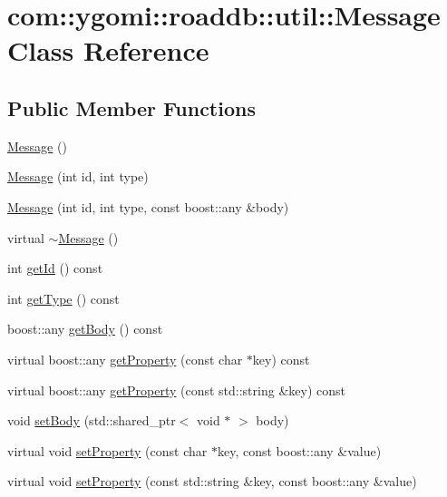 \hypertarget{classcom_1_1ygomi_1_1roaddb_1_1util_1_1Message}{\section{com\-:\-:ygomi\-:\-:roaddb\-:\-:util\-:\-:Message Class Reference}
\label{classcom_1_1ygomi_1_1roaddb_1_1util_1_1Message}
}
\subsection*{Public Member Functions}
\begin{DoxyCompactItemize}
\item 
\hyperlink{classcom_1_1ygomi_1_1roaddb_1_1util_1_1Message_a7013741ef0d9d35dac1c4634272fe690}{Message} ()
\item 
\hyperlink{classcom_1_1ygomi_1_1roaddb_1_1util_1_1Message_aa3a005ef9465847783c122bd13cdb5d2}{Message} (int id, int type)
\item 
\hyperlink{classcom_1_1ygomi_1_1roaddb_1_1util_1_1Message_aa7b887436102ba55630ed94858b7ce5b}{Message} (int id, int type, const boost\-::any \&body)
\item 
virtual \hyperlink{classcom_1_1ygomi_1_1roaddb_1_1util_1_1Message_a348a100b81bd1dfe99669a3d390da0fc}{$\sim$\-Message} ()
\item 
int \hyperlink{classcom_1_1ygomi_1_1roaddb_1_1util_1_1Message_aee9d535ec201f6c3ef78cbdc819d1ba4}{get\-Id} () const 
\item 
int \hyperlink{classcom_1_1ygomi_1_1roaddb_1_1util_1_1Message_a3229c4264476f1268dc27aa8e917f8ca}{get\-Type} () const 
\item 
boost\-::any \hyperlink{classcom_1_1ygomi_1_1roaddb_1_1util_1_1Message_a88a5f49722b87b0b77455dfa22563ce4}{get\-Body} () const 
\item 
virtual boost\-::any \hyperlink{classcom_1_1ygomi_1_1roaddb_1_1util_1_1Message_ac17b01f461d7e5421dc8c95a49a5c154}{get\-Property} (const char $\ast$key) const 
\item 
virtual boost\-::any \hyperlink{classcom_1_1ygomi_1_1roaddb_1_1util_1_1Message_a70cf59ee0ea1d70d78fccc8a004dc1d7}{get\-Property} (const std\-::string \&key) const 
\item 
void \hyperlink{classcom_1_1ygomi_1_1roaddb_1_1util_1_1Message_a3874850fd7f16dea468611afff340906}{set\-Body} (std\-::shared\-\_\-ptr$<$ void $\ast$ $>$ body)
\item 
virtual void \hyperlink{classcom_1_1ygomi_1_1roaddb_1_1util_1_1Message_a881d0a7eb63d8a44c74d4d7779a882ba}{set\-Property} (const char $\ast$key, const boost\-::any \&value)
\item 
virtual void \hyperlink{classcom_1_1ygomi_1_1roaddb_1_1util_1_1Message_abe3c2677be0c311b934c9bcf15087381}{set\-Property} (const std\-::string \&key, const boost\-::any \&value)
\end{DoxyCompactItemize}


